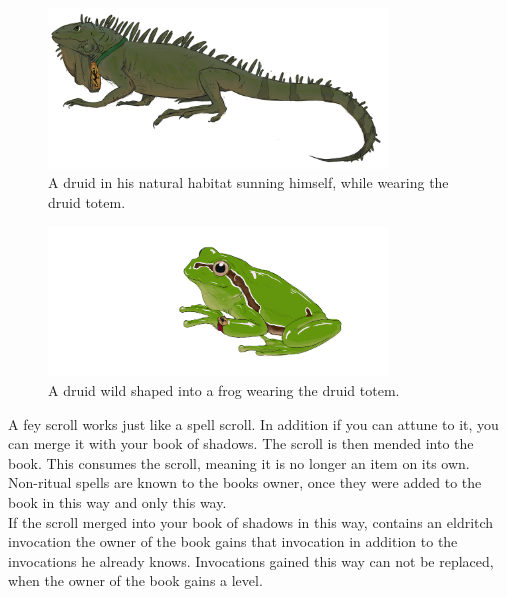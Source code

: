 \documentclass[letter,10pt,twocolumn,openany]{dndbook}
\begin{document}
\begin{figure}
    \includegraphics[width=9cm]{images/iguana.png}
    \caption{A druid in his natural habitat sunning himself, while wearing the druid totem.}
\end{figure}

\begin{figure}
    \includegraphics[width=9cm]{images/frog.png}
    \caption{A druid wild shaped into a frog wearing the druid totem.}
\end{figure}


A fey scroll works just like a spell scroll. In addition if you can attune to it, you can merge it with your book of shadows. The scroll is then mended into the book. This consumes the scroll, meaning it is no longer an item on its own.\\
Non-ritual spells are known to the books owner, once they were added to the book in this way and only this way.\\
If the scroll merged into your book of shadows in this way, contains an eldritch invocation the owner of the book gains that invocation in addition to the invocations he already knows. Invocations gained this way can not be replaced, when the owner of the book gains a level.
\end{document}
